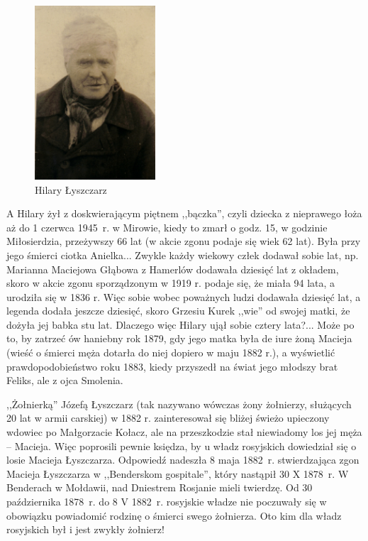 \begin{figure}[!h]
\begin{center}
\includegraphics[width=0.4\textwidth]{zdjecia/hilary_lyszczarz.jpg}
\caption{Hilary Łyszczarz}
\label{rys:hilary_lyszczarz}
\end{center}
\end{figure}

A Hilary żył z doskwierającym piętnem ,,bączka'', czyli dziecka z nieprawego łoża aż do 1 czerwca 1945~r. w Mirowie, kiedy to zmarł o godz. 15, w godzinie Miłosierdzia, przeżywszy 66 lat (w akcie zgonu podaje się wiek 62 lat). Była przy jego śmierci ciotka Anielka... Zwykle każdy wiekowy człek dodawał sobie lat, np. Marianna Maciejowa Głąbowa z Hamerlów dodawała dziesięć lat z okładem, skoro w akcie zgonu sporządzonym w 1919 r. podaje się, że miała 94 lata, a urodziła się w 1836 r. Więc sobie  wobec poważnych ludzi dodawała dziesięć lat, a legenda dodała jeszcze dziesięć, skoro Grzesiu Kurek ,,wie'' od swojej matki, że dożyła jej babka stu lat. Dlaczego więc Hilary ujął sobie cztery lata?... Może po to, by zatrzeć ów haniebny rok 1879, gdy jego matka była de iure żoną Macieja (wieść o śmierci męża dotarła do niej dopiero w maju 1882 r.), a wyświetlić prawdopodobieństwo roku 1883, kiedy przyszedł na świat jego młodszy brat Feliks, ale z ojca Smolenia.

,,Żołnierką'' Józefą Łyszczarz (tak nazywano wówczas żony żołnierzy, służących 20 lat w armii carskiej) w 1882 r. zainteresował się bliżej  świeżo upieczony wdowiec po Małgorzacie Kołacz, ale na przeszkodzie stał niewiadomy los jej męża -- Macieja. Więc poprosili pewnie księdza, by u władz rosyjskich dowiedział się o losie Macieja Łyszczarza. Odpowiedź nadeszła 8 maja 1882~r. stwierdzająca zgon Macieja Łyszczarza w ,,Benderskom gospitale'', który nastąpił 30 X 1878~r. W Benderach w Mołdawii, nad Dniestrem Rosjanie mieli twierdzę. Od 30 października 1878~r. do 8 V 1882~r. rosyjskie władze nie poczuwały się w obowiązku powiadomić rodzinę o śmierci swego żołnierza. Oto kim dla władz rosyjskich był i jest zwykły żołnierz!


